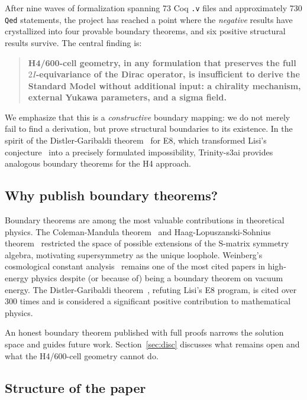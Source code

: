 \documentclass[12pt,a4paper]{article}
\newcommand{\TwoI}{2I}
\begin{document}
After nine waves of formalization spanning 73 Coq \texttt{.v} files and approximately
730 \texttt{Qed} statements, the project has reached a point where the \emph{negative}
results have crystallized into four provable boundary theorems, and six positive structural
results survive. The central finding is:

\begin{quote}
\textbf{H4/600-cell geometry, in any formulation that preserves the full \(\TwoI\)-equivariance
of the Dirac operator, is insufficient to derive the Standard Model without additional
input: a chirality mechanism, external Yukawa parameters, and a sigma field.}
\end{quote}

We emphasize that this is a \emph{constructive} boundary mapping: we do not merely fail to find a
derivation, but prove structural boundaries to its existence. In the spirit of the
Distler-Garibaldi theorem~\cite{Distler:2009dm} for E8, which transformed Lisi's
conjecture~\cite{Lisi:2007rx} into a precisely formulated impossibility,
Trinity-s3ai provides analogous boundary theorems for the H4 approach.

\subsection{Why publish boundary theorems?}

Boundary theorems are among the most valuable contributions in theoretical physics.
The Coleman-Mandula theorem~\cite{Coleman:1967ad} and Haag-Lopuszanski-Sohnius
theorem~\cite{Haag:1974qh} restricted the space of possible extensions of the S-matrix
symmetry algebra, motivating supersymmetry as the unique loophole.
Weinberg's cosmological constant analysis~\cite{Weinberg:1988cp} remains one of the most
cited papers in high-energy physics despite (or because of) being a boundary theorem on vacuum energy.
The Distler-Garibaldi theorem~\cite{Distler:2009dm}, refuting Lisi's E8 program, is cited
over 300 times and is considered a significant positive contribution to mathematical physics.

An honest boundary theorem published with full proofs narrows the solution space and guides
future work. Section~\ref{sec:disc} discusses what remains open and what the H4/600-cell
geometry cannot do.

\subsection{Structure of the paper}
\end{document}
